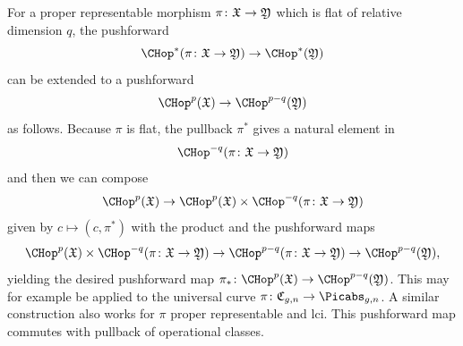 For a proper representable morphism $\pi\colon \frak X \to \frak Y$ which is flat of relative dimension $q$, the pushforward
\[\CHop^*(\pi\colon \frak X \to \frak Y) \to \CHop^*(\frak Y)\]
can be extended to a pushforward
$$\CHop^{p}(\frak X)\to \CHop^{p-q} (\frak Y) $$
as follows. Because $\pi$ is flat, the pullback $\pi^*$ gives a natural element in $$\CHop^{-q}(\pi\colon \frak X \to \frak Y)$$ %
and then we can compose
\[\CHop^{p}(\frak X)\to \CHop^{p}(\frak X) \times \CHop^{-q}(\pi\colon \frak X \to \frak Y) \]
given by $c \mapsto  (c,\pi^*)$ with the product and the pushforward maps
\[\CHop^{p}(\frak X) \times \CHop^{-q}(\pi\colon \frak X \to \frak Y) \to \CHop^{p-q}(\pi\colon \frak X \to \frak Y) \to \CHop^{p-q}(\frak Y),\]
yielding the desired pushforward map $\pi_*\colon \CHop^{p}(\frak X)\to \CHop^{p-q} (\frak Y)$. This may for example be applied to the universal curve $\pi\colon \frak C_{g,n} \to \Picabs_{g,n}$. A similar construction also works for $\pi$ proper representable and lci. This pushforward map commutes with pullback of operational classes.
%
